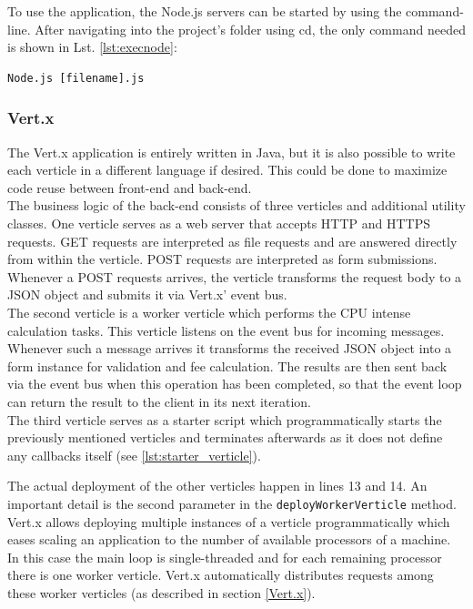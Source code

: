 To use the application, the Node.js servers can be started by using the command-line. After navigating
into the project’s folder using cd, the only command needed is shown in Lst. \ref{lst:execnode}:
\begin{lstlisting}[caption={Executing Node.js code},label=lst:execnode]
Node.js [filename].js
\end{lstlisting}


\subsubsection{Vert.x}
\label{implementation_vertx}

The Vert.x application is entirely written in Java, but it is also possible to
write each verticle in a different language if desired. This could be done to
maximize code reuse between front-end and back-end.\\
The business logic of the back-end consists of three verticles and additional
utility classes.
One verticle serves as a web server that accepts HTTP and HTTPS requests. GET
requests are interpreted as file requests and are answered directly from within
the verticle. POST requests are interpreted as form submissions. Whenever a POST
requests arrives, the verticle transforms the request body to a JSON object and
submits it via Vert.x' event bus.\\
The second verticle is a worker verticle which performs the CPU intense calculation
tasks. This verticle listens on the event bus for incoming messages. Whenever
such a message arrives it transforms the received JSON object into a form
instance for validation and fee calculation. The results are then sent back via
the event bus when this operation has been completed, so that the event loop can return
the result to the client in its next iteration.\\
The third verticle serves as a starter script which programmatically starts
the previously mentioned verticles and terminates afterwards as it does not
define any callbacks itself (see \autoref{lst:starter_verticle}).



The actual deployment of the other verticles happen in lines 13 and 14.
An important detail is the second parameter in the \texttt{deployWorkerVerticle} method.
Vert.x allows deploying multiple instances of a verticle programmatically
which eases scaling an application to the number of available processors of a machine.
In this case the main loop is single-threaded and for each remaining processor
there is one worker verticle. Vert.x automatically distributes requests among
these worker verticles (as described in section \ref{Vert.x}).

